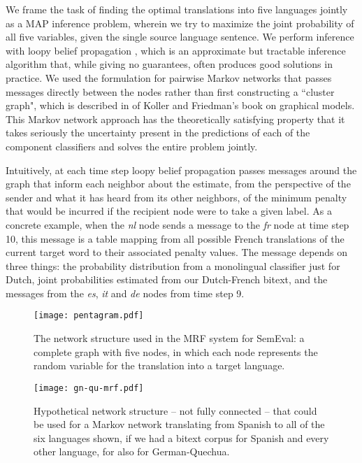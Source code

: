 We frame the task of finding the optimal translations into five languages
jointly as a MAP inference problem, wherein we try to maximize the joint
probability of all five variables, given the single source language sentence.
We perform inference with loopy belief propagation
\cite{DBLP:conf/uai/MurphyWJ99}, which is an approximate but tractable
inference algorithm that, while giving no guarantees, often produces good
solutions in practice.
We used the formulation for pairwise Markov networks that passes messages
directly between the nodes rather than first constructing a ``cluster graph",
which is described in \cite[\S 11.3.5.1]{Koller+Friedman:09} of Koller and
Friedman's book on graphical models. This Markov network approach has the
theoretically satisfying property that it takes seriously the uncertainty
present in the predictions of each of the component classifiers and solves the
entire problem jointly. 

Intuitively, at each time step loopy belief propagation passes messages around
the graph that inform each neighbor about the estimate, from the perspective of
the sender and what it has heard from its other neighbors, of the minimum
penalty that would be incurred if the recipient node were to take a given
label. As a concrete example, when the \emph{nl} node sends a message to the
\emph{fr} node at time step 10, this message is a table mapping from all
possible French translations of the current target word to their associated
penalty values. The message depends on three things: the probability
distribution from a monolingual classifier just for Dutch, joint probabilities
estimated from our Dutch-French bitext, and the messages from the \emph{es},
\emph{it} and \emph{de} nodes from time step 9.

\begin{figure}
  \begin{center}
  \texttt{[image: pentagram.pdf]}
  \end{center}
  \caption{The network structure used in the MRF system for SemEval: a complete
  graph with five nodes, in which each node represents the random variable for
  the translation into a target language.}
  \label{fig:pentagram}
\end{figure}

\begin{figure}
  \begin{center}
  \texttt{[image: gn-qu-mrf.pdf]}
  \end{center}
  \caption{Hypothetical network structure -- not fully connected -- that could
  be used for a Markov network translating from Spanish to all of the six
  languages shown, if we had a bitext corpus for Spanish and every
  other language, for also for German-Quechua.}
  \label{fig:gn-qu-mrf}
\end{figure}

